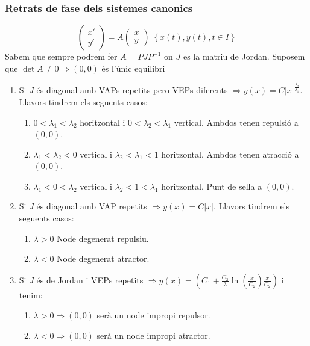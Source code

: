 \documentclass[../main.tex]{subfiles}
\begin{document}
\subsubsection{Retrats de fase dels sistemes canonics}
\begin{displaymath}
	\begin{pmatrix}
		x'\\y'
	\end{pmatrix}
	=
	A \begin{pmatrix}
		x\\y
	\end{pmatrix}
	\; \left\{x(t), y(t), t \in I\right\}
\end{displaymath}
Sabem que sempre podrem fer $A = PJP^{-1}$ on $J$ es la matriu de Jordan.
Suposem que $\det{A} \neq 0 \Rightarrow (0,0)$ és l'únic equilibri
\begin{enumerate}
	\item Si $J$ és diagonal amb VAPs repetits pero VEPs diferents $\Rightarrow y(x) = C|x|^\frac{\lambda_2}{\lambda_1}$. Llavors tindrem els seguents casos:
	\begin{enumerate}
		\item $0 < \lambda_1 < \lambda_2$ horitzontal i $0 < \lambda_2 < \lambda_1$ vertical. Ambdos tenen repulsió a $(0,0)$.
		\item $\lambda_1 < \lambda_2 < 0$ vertical i $\lambda_2 < \lambda_1 < 1$ horitzontal. Ambdos tenen atracció a $(0,0)$.
		\item $\lambda_1 < 0 < \lambda_2$ vertical i $\lambda_2 < 1 < \lambda_1$ horitzontal. Punt de sella a $(0,0)$.
	\end{enumerate}
	\item Si $J$ és diagonal amb VAP repetits $\Rightarrow y(x) = C|x|$. Llavors tindrem els seguents casos:
	\begin{enumerate}
		\item $\lambda > 0$ Node degenerat repulsiu.
		\item $\lambda < 0$ Node degenerat atractor.
	\end{enumerate}
	\item Si $J$ és de Jordan i VEPs repetits $\Rightarrow y(x) = \left(C_1 + \frac{C_2}{\lambda} \ln\left(\frac{x}{C_2}\right)\frac{x}{C_2}\right)$ i tenim:
	\begin{enumerate}
		\item $\lambda > 0 \Rightarrow (0,0)$ serà un node impropi repulsor.
		\item $\lambda < 0 \Rightarrow (0,0)$ serà un node impropi atractor.
	\end{enumerate}

\end{enumerate}
\end{document}
